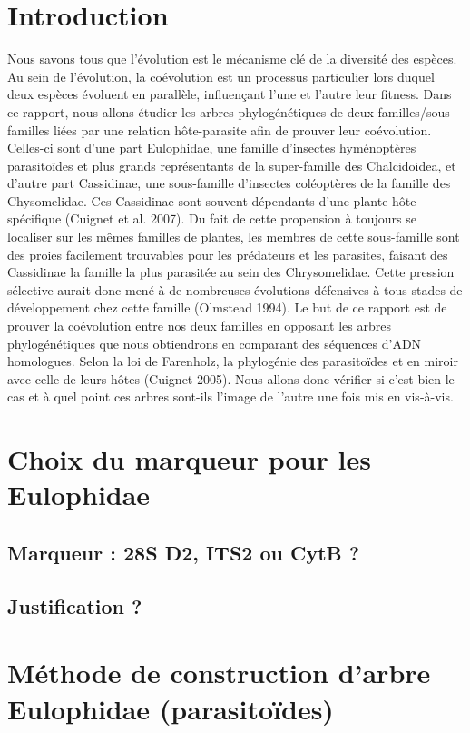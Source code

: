 \documentclass[a4paper, 11pt]{article}
\begin{document}
\section{Introduction}
Nous savons tous que l’évolution est le mécanisme clé de la diversité des espèces. Au sein de l’évolution, la coévolution est un processus particulier lors duquel deux espèces évoluent en parallèle, influençant l’une et l’autre leur fitness. Dans ce rapport, nous allons étudier les arbres phylogénétiques de deux familles/sous-familles liées par une relation hôte-parasite afin de prouver leur coévolution. Celles-ci sont d’une part Eulophidae, une famille d’insectes hyménoptères parasitoïdes et plus grands représentants de la super-famille des Chalcidoidea, et d’autre part Cassidinae, une sous-famille d’insectes coléoptères de la famille des Chysomelidae. Ces Cassidinae sont souvent dépendants d’une plante hôte spécifique (Cuignet et al. 2007). Du fait de cette propension à toujours se localiser sur les mêmes familles de plantes, les membres de cette sous-famille sont des proies facilement trouvables pour les prédateurs et les parasites, faisant des Cassidinae la famille la plus parasitée au sein des Chrysomelidae. Cette pression sélective aurait donc mené à de nombreuses évolutions défensives à tous stades de développement chez cette famille (Olmstead 1994).
Le but de ce rapport est de prouver la coévolution entre nos deux familles en opposant les arbres phylogénétiques que nous obtiendrons en comparant des séquences d’ADN homologues. Selon la loi de Farenholz, la phylogénie des parasitoïdes et en miroir avec celle de leurs hôtes (Cuignet 2005). Nous allons donc vérifier si c’est bien le cas et à quel point ces arbres sont-ils l’image de l’autre une fois mis en vis-à-vis.


\section{Choix du marqueur pour les Eulophidae}

\subsection{Marqueur : 28S D2, ITS2 ou CytB ?} 

\subsection{Justification ?}

\section{Méthode de construction d'arbre Eulophidae (parasitoïdes)}
\end{document}
